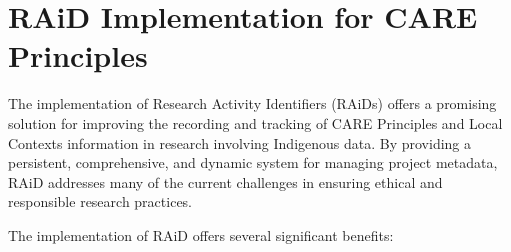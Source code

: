 \documentclass[a0,portrait]{a0poster}
\begin{document}
\begin{multicols}{2}
\begin{center}

\parbox{0.8\columnwidth}{
}
\end{center}




\color{ARDCPurple}
\section*{\LARGE RAiD Implementation for CARE Principles}
\color{DarkGrey}
\large{
The implementation of Research Activity Identifiers (RAiDs) offers a promising solution for improving the recording and tracking of CARE Principles and Local Contexts information in research involving Indigenous data. By providing a persistent, comprehensive, and dynamic system for managing project metadata, RAiD addresses many of the current challenges in ensuring ethical and responsible research practices.

The implementation of RAiD offers several significant benefits:

}
\end{multicols}
\end{document}
